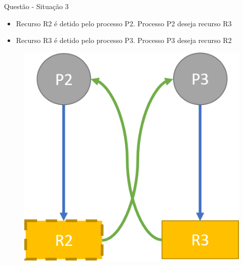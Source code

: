 \documentclass[aspectratio=169,
				xcolor=table]{beamer}
\begin{document}
	\begin{frame}{Questão - Situação 3}
		\begin{itemize}
			\item Recurso R2 é detido pelo processo P2. Processo P2 deseja recurso R3			
			\item Recurso R3 é detido pelo processo P3. Processo P3 deseja recurso R2
		\end{itemize}
		\begin{figure}
			\centering
			\includegraphics[keepaspectratio, height=0.7\paperheight]{../figs/cap07/exercicio05.png}			
		\end{figure}		
	\end{frame}
				
\end{document}
